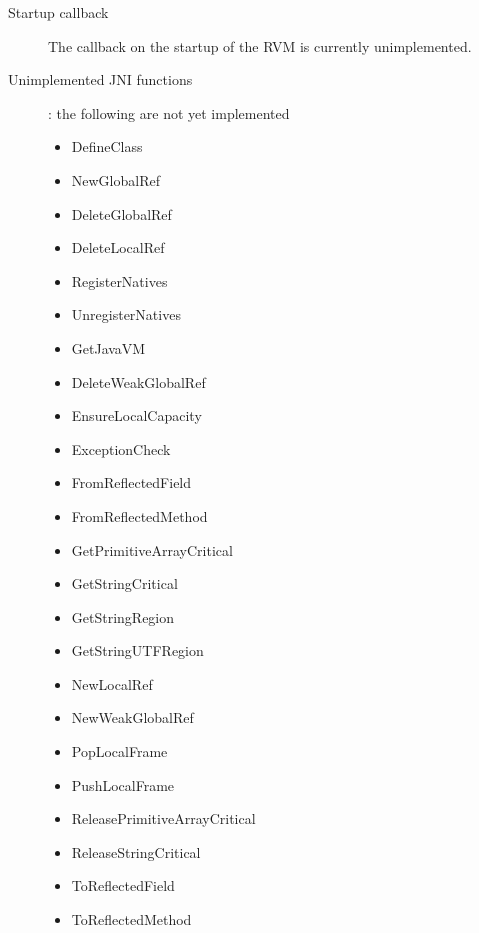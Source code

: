 \begin{description}
\item [Startup callback] The callback on the startup of the RVM is currently
unimplemented.
\item [Unimplemented JNI functions]: the following are not yet implemented
\begin{itemize}
\item   DefineClass         
\item   NewGlobalRef        
\item   DeleteGlobalRef     
\item   DeleteLocalRef      
\item   RegisterNatives     
\item   UnregisterNatives   
\item   GetJavaVM           
\item   DeleteWeakGlobalRef             
\item   EnsureLocalCapacity          
\item   ExceptionCheck              
\item   FromReflectedField         
\item   FromReflectedMethod       
\item   GetPrimitiveArrayCritical   
\item   GetStringCritical          
\item   GetStringRegion          
\item   GetStringUTFRegion      
\item   NewLocalRef            
\item   NewWeakGlobalRef      
\item   PopLocalFrame                 
\item   PushLocalFrame               
\item   ReleasePrimitiveArrayCritical 
\item   ReleaseStringCritical        
\item   ToReflectedField            
\item   ToReflectedMethod          
\end{itemize}
\end{description}


